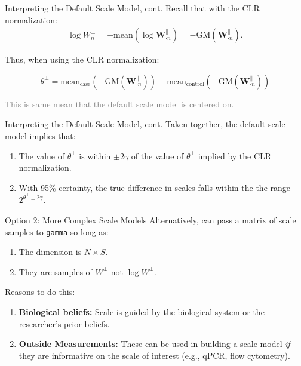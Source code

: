\documentclass[
  ignorenonframetext,
]{beamer}
\providecommand{\tightlist}{%
  \setlength{\itemsep}{0pt}\setlength{\parskip}{0pt}}
\begin{document}
\begin{frame}{Interpreting the Default Scale Model, cont.}
\protect\hypertarget{interpreting-the-default-scale-model-cont.-1}{}
Recall that with the CLR normalization: \begin{align*}
\log W_n^\perp = -\text{mean}(\log \mathbf{W}_{\cdot n}^\parallel) = - \text{GM}( \mathbf{W}_{\cdot n}^\parallel).
\end{align*}

Thus, when using the CLR normalization:

\[\theta^\perp = \text{mean}_{\text{case}}(-\text{GM}( \mathbf{W}_{\cdot n}^\parallel)) - \text{mean}_{\text{control}}(-\text{GM}( \mathbf{W}_{\cdot n}^\parallel)) \]

\textcolor{gray}{This is same mean that the default scale model is centered on.}
\end{frame}

\begin{frame}{Interpreting the Default Scale Model, cont.}
\protect\hypertarget{interpreting-the-default-scale-model-cont.-2}{}
Taken together, the default scale model implies that:

\begin{enumerate}
\item
  The value of \(\theta^\perp\) is within \(\pm 2 \gamma\) of the value
  of \(\theta^\perp\) implied by the CLR normalization.
\item
  With 95\% certainty, the true difference in scales falls within the
  the range \(2^{\theta^\perp \pm 2 \gamma}\).
\end{enumerate}
\end{frame}

\begin{frame}[fragile]{Option 2: More Complex Scale Models}
\protect\hypertarget{option-2-more-complex-scale-models}{}
Alternatively, can pass a matrix of scale samples to \texttt{gamma} so
long as:

\begin{enumerate}
\tightlist
\item
  The dimension is \(N \times S\).
\item
  They are samples of \(W^\perp\) not \(\log W^\perp\).
\end{enumerate}

Reasons to do this:

\begin{enumerate}
\item
  \textbf{Biological beliefs:} Scale is guided by the biological system
  or the researcher's prior beliefs.
\item
  \textbf{Outside Measurements:} These can be used in building a scale
  model \emph{if} they are informative on the scale of interest (e.g.,
  qPCR, flow cytometry).
\end{enumerate}
\end{frame}
\end{document}

